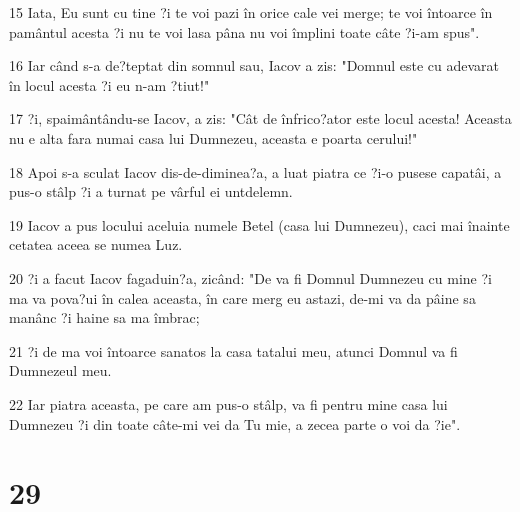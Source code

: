 \par 15 Iata, Eu sunt cu tine ?i te voi pazi în orice cale vei merge; te voi întoarce în pamântul acesta ?i nu te voi lasa pâna nu voi împlini toate câte ?i-am spus".
\par 16 Iar când s-a de?teptat din somnul sau, Iacov a zis: "Domnul este cu adevarat în locul acesta ?i eu n-am ?tiut!"
\par 17 ?i, spaimântându-se Iacov, a zis: "Cât de înfrico?ator este locul acesta! Aceasta nu e alta fara numai casa lui Dumnezeu, aceasta e poarta cerului!"
\par 18 Apoi s-a sculat Iacov dis-de-diminea?a, a luat piatra ce ?i-o pusese capatâi, a pus-o stâlp ?i a turnat pe vârful ei untdelemn.
\par 19 Iacov a pus locului aceluia numele Betel (casa lui Dumnezeu), caci mai înainte cetatea aceea se numea Luz.
\par 20 ?i a facut Iacov fagaduin?a, zicând: "De va fi Domnul Dumnezeu cu mine ?i ma va pova?ui în calea aceasta, în care merg eu astazi, de-mi va da pâine sa manânc ?i haine sa ma îmbrac;
\par 21 ?i de ma voi întoarce sanatos la casa tatalui meu, atunci Domnul va fi Dumnezeul meu.
\par 22 Iar piatra aceasta, pe care am pus-o stâlp, va fi pentru mine casa lui Dumnezeu ?i din toate câte-mi vei da Tu mie, a zecea parte o voi da ?ie".

\chapter{29}

